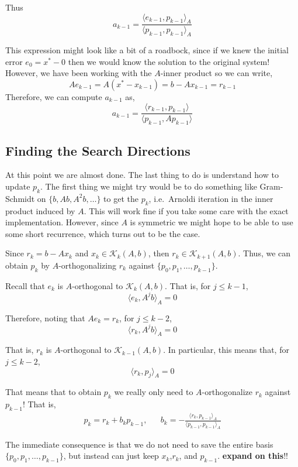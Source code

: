 Thus \[
a_{k-1} 
= \frac{\langle e_{k-1}, p_{k-1} \rangle_A}{\langle p_{k-1},p_{k-1} \rangle_A} 
\]

This expression might look like a bit of a roadbock, since if we knew
the initial error \(e_0 = x^* - 0\) then we would know the solution to
the original system! However, we have been working with the \(A\)-inner
product so we can write, \[
Ae_{k-1} = A(x^* - x_{k-1}) = b - Ax_{k-1} = r_{k-1}
\] Therefore, we can compute \(a_{k-1}\) as, \[
a_{k-1}
= \frac{\langle r_{k-1}, p_{k-1} \rangle}{\langle p_{k-1},A p_{k-1} \rangle} 
\]

\hypertarget{finding-the-search-directions}{%
\subsection{Finding the Search
Directions}\label{finding-the-search-directions}}

At this point we are almost done. The last thing to do is understand how
to update \(p_k\). The first thing we might try would be to do something
like Gram-Schmidt on \(\{b,Ab,A^2b,\ldots \}\) to get the \(p_k\),
i.e.~Arnoldi iteration in the inner product induced by \(A\). This will
work fine if you take some care with the exact implementation. However,
since \(A\) is symmetric we might hope to be able to use some short
recurrence, which turns out to be the case.

Since \(r_k = b-Ax_k\) and \(x_k\in\mathcal{K}_k(A,b)\), then
\(r_k \in \mathcal{K}_{k+1}(A,b)\). Thus, we can obtain \(p_k\) by
\(A\)-orthogonalizing \(r_k\) against \(\{p_0,p_1,\ldots,p_{k-1}\}\).

Recall that \(e_k\) is \(A\)-orthogonal to \(\mathcal{K}_k(A,b)\). That
is, for \(j\leq k-1\), \[
\langle e_k, A^j b \rangle_A = 0
\]

Therefore, noting that \(Ae_k = r_k\), for \(j\leq k-2\), \[
\langle r_k, A^j b \rangle_A = 0
\]

That is, \(r_k\) is \(A\)-orthogonal to \(\mathcal{K}_{k-1}(A,b)\). In
particular, this means that, for \(j\leq k-2\), \[
\langle r_k, p_j \rangle_A = 0
\]

That means that to obtain \(p_k\) we really only need to
\(A\)-orthogonalize \(r_k\) against \(p_{k-1}\)! That is, \begin{align*}
p_k = r_k + b_k p_{k-1}
,&&
b_k = - \frac{\langle r_k, p_{k-1} \rangle_A}{\langle p_{k-1}, p_{k-1} \rangle_A}
\end{align*}

The immediate consequence is that we do not need to save the entire
basis \(\{p_0,p_1,\ldots,p_{k-1}\}\), but instead can just keep
\(x_k\),\(r_k\), and \(p_{k-1}\). \textbf{expand on this}!!

